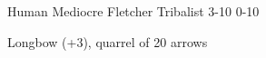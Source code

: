 
\begin{filledCS}%
  {\composeHumanName}%
  {Human}%
  {Mediocre Fletcher}%
  {Tribalist}%
  {{3}{-1}{0}}%
  {{0}{-1}{0}}%
  {%
    \setcounter{Athletics}{1}
    \setcounter{Crafts}{2}
    \setcounter{Cultivation}{1}
    \setcounter{Empathy}{1}
    \setcounter{Survival}{1}

    \setcounter{Projectiles}{1}
    \greatsword
    \partialchain
    \addtocounter{equipmentWeight}{1}
  }%
  {\guardian}%
  {Longbow (+3), quarrel of 20 arrows}%
  \renewcommand\rank{Fodder}
  \renewcommand\characterDebt{100 \glspl{sp}}

\end{filledCS}

